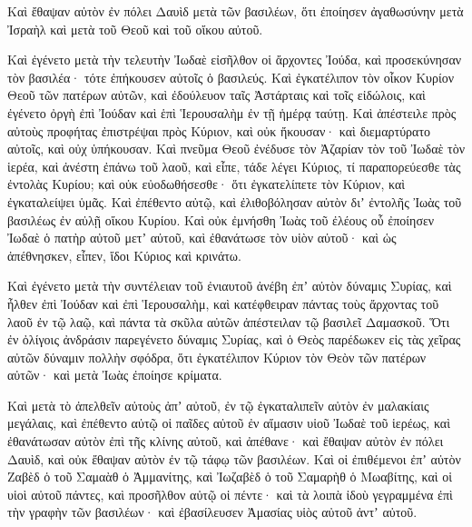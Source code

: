 {Καὶ ἔθαψαν αὐτὸν ἐν πόλει Δαυὶδ μετὰ τῶν βασιλέων, ὅτι ἐποίησεν ἀγαθωσύνην μετὰ Ἰσραὴλ καὶ μετὰ τοῦ Θεοῦ καὶ τοῦ οἴκου αὐτοῦ.
\par }{\PP {}Καὶ ἐγένετο μετὰ τὴν τελευτὴν Ἰωδαὲ εἰσῆλθον οἱ ἄρχοντες Ἰούδα, καὶ προσεκύνησαν τὸν βασιλέα· τότε ἐπήκουσεν αὐτοῖς ὁ βασιλεύς.
Καὶ ἐγκατέλιπον τὸν οἶκον Κυρίον Θεοῦ τῶν πατέρων αὐτῶν, καὶ ἐδούλευον ταῖς Ἀστάρταις καὶ τοῖς εἰδώλοις, καὶ ἐγένετο ὀργὴ ἐπὶ Ἰούδαν καὶ ἑπὶ Ἱερουσαλὴμ ἐν τῇ ἡμέρᾳ ταύτῃ.
Καὶ ἀπέστειλε πρὸς αὐτοὺς προφήτας ἐπιστρέψαι πρὸς Κύριον, καὶ οὐκ ἤκουσαν· καὶ διεμαρτύρατο αὐτοῖς, καὶ οὐχ ὑπήκουσαν.
Καὶ πνεῦμα Θεοῦ ἐνέδυσε τὸν Ἀζαρίαν τὸν τοῦ Ἰωδαὲ τὸν ἱερέα, καὶ ἀνέστη ἐπάνω τοῦ λαοῦ, καὶ εἶπε, τάδε λέγει Κύριος, τί παραπορεύεσθε τὰς ἐντολὰς Κυρίου; καὶ οὐκ εὐοδωθήσεσθε· ὅτι ἐγκατελίπετε τὸν Κύριον, καὶ ἐγκαταλείψει ὑμᾶς.
Καὶ ἐπέθεντο αὐτῷ, καὶ ἐλιθοβόλησαν αὐτὸν διʼ ἐντολῆς Ἰωὰς τοῦ βασιλέως ἐν αὐλῇ οἴκου Κυρίου.
Καὶ οὐκ ἐμνήσθη Ἰωὰς τοῦ ἐλέους οὗ ἐποίησεν Ἰωδαὲ ὁ πατὴρ αὐτοῦ μετʼ αὐτοῦ, καὶ ἐθανάτωσε τὸν υἱὸν αὐτοῦ· καὶ ὡς ἀπέθνησκεν, εἶπεν, ἴδοι Κύριος καὶ κρινάτω.
\par }{\PP {}Καὶ ἐγένετο μετὰ τὴν συντέλειαν τοῦ ἐνιαυτοῦ ἀνέβη ἐπʼ αὐτὸν δύναμις Συρίας, καὶ ἦλθεν ἐπὶ Ἰούδαν καὶ ἐπὶ Ἱερουσαλὴμ, καὶ κατέφθειραν πάντας τοὺς ἄρχοντας τοῦ λαοῦ ἐν τῷ λαῷ, καὶ πάντα τὰ σκῦλα αὐτῶν ἀπέστειλαν τῷ βασιλεῖ Δαμασκοῦ.
Ὅτι ἐν ὀλίγοις ἀνδράσιν παρεγένετο δύναμις Συρίας, καὶ ὁ Θεὸς παρέδωκεν εἰς τὰς χεῖρας αὐτῶν δύναμιν πολλὴν σφόδρα, ὅτι ἐγκατέλιπον Κύριον τὸν Θεὸν τῶν πατέρων αὐτῶν· καὶ μετὰ Ἰωὰς ἐποίησε κρίματα.
\par }{\PP {}Καὶ μετὰ τὸ ἀπελθεῖν αὐτοὺς ἀπʼ αὐτοῦ, ἐν τῷ ἐγκαταλιπεῖν αὐτὸν ἐν μαλακίαις μεγάλαις, καὶ ἐπέθεντο αὐτῷ οἱ παῖδες αὐτοῦ ἐν αἵμασιν υἱοῦ Ἰωδαὲ τοῦ ἱερέως, καὶ ἐθανάτωσαν αὐτὸν ἐπὶ τῆς κλίνης αὐτοῦ, καὶ ἀπέθανε· καὶ ἔθαψαν αὐτὸν ἐν πόλει Δαυὶδ, καὶ οὐκ ἔθαψαν αὐτὸν ἐν τῷ τάφῳ τῶν βασιλέων.
Καὶ οἱ ἐπιθέμενοι ἐπʼ αὐτὸν Ζαβὲδ ὁ τοῦ Σαμαὰθ ὁ Ἀμμανίτης, καὶ Ἰωζαβὲδ ὁ τοῦ Σαμαρὴθ ὁ Μωαβίτης,
καὶ οἱ υἱοὶ αὐτοῦ πάντες, καὶ προσῆλθον αὐτῷ οἱ πέντε· καὶ τὰ λοιπὰ ἰδοὺ γεγραμμένα ἐπὶ τὴν γραφὴν τῶν βασιλέων· καὶ ἐβασίλευσεν Ἀμασίας υἱὸς αὐτοῦ ἀντʼ αὐτοῦ.

}
